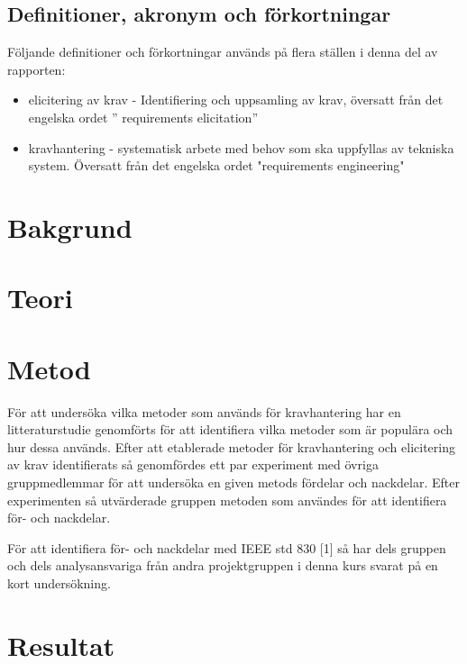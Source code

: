 \subsection{Definitioner, akronym och förkortningar}
Följande definitioner och förkortningar används på flera ställen i denna del av rapporten:
\begin{itemize}
	\item elicitering av krav - Identifiering och uppsamling av krav, översatt från det engelska ordet ” requirements elicitation”
	\item kravhantering - systematisk arbete med behov som ska uppfyllas av tekniska system. Översatt från det engelska ordet "requirements engineering"
\end{itemize}
\section{Bakgrund}
\label{sec:background-jannering}


\section{Teori}
\label{sec:theory-jannering}


\section{Metod}
\label{sec:method-jannering}

För att undersöka vilka metoder som används för kravhantering har en litteraturstudie genomförts för att identifiera vilka metoder som är populära och hur dessa används. Efter att etablerade metoder för kravhantering och elicitering av krav identifierats så genomfördes ett par experiment med övriga gruppmedlemmar för att undersöka en given metods fördelar och nackdelar. Efter experimenten så utvärderade gruppen metoden som användes för att identifiera för- och nackdelar. 

För att identifiera för- och nackdelar med IEEE std 830 [1] så har dels gruppen och dels analysansvariga från andra projektgruppen i denna kurs svarat på en kort undersökning.


\section{Resultat}
\label{sec:results-jannering}

